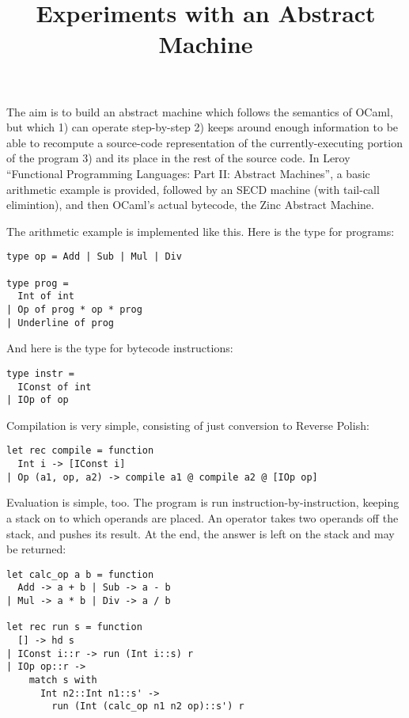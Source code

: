 \documentclass[10pt]{article}
\begin{document}
\title{Experiments with an Abstract Machine}
\maketitle

\noindent The aim is to build an abstract machine which follows the semantics of OCaml, but which 1) can operate step-by-step 2) keeps around enough information to be able to recompute a source-code representation of the currently-executing portion of the program 3) and its place in the rest of the source code. In Leroy ``Functional Programming Languages: Part II: Abstract Machines'', a basic arithmetic example is provided, followed by an SECD machine (with tail-call elimintion), and then OCaml's actual bytecode, the Zinc Abstract Machine.

The arithmetic example is implemented like this. Here is the type for programs:

\begin{verbatim}
type op = Add | Sub | Mul | Div

type prog =
  Int of int
| Op of prog * op * prog
| Underline of prog
\end{verbatim}

And here is the type for bytecode instructions:

\begin{verbatim}
type instr =
  IConst of int
| IOp of op
\end{verbatim}

Compilation is very simple, consisting of just conversion to  Reverse Polish:

\begin{verbatim}
let rec compile = function
  Int i -> [IConst i]
| Op (a1, op, a2) -> compile a1 @ compile a2 @ [IOp op]
\end{verbatim}

Evaluation is simple, too. The program is run instruction-by-instruction, keeping a stack on to which operands are placed. An operator takes two operands off the stack, and pushes its result. At the end, the answer is left on the stack and may be returned:

\begin{verbatim}
let calc_op a b = function
  Add -> a + b | Sub -> a - b
| Mul -> a * b | Div -> a / b

let rec run s = function
  [] -> hd s
| IConst i::r -> run (Int i::s) r
| IOp op::r ->
    match s with
      Int n2::Int n1::s' ->
        run (Int (calc_op n1 n2 op)::s') r
\end{verbatim}
\end{document}
